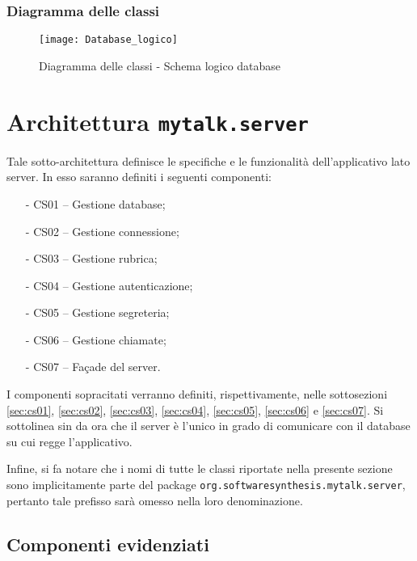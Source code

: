 \subsubsection{Diagramma delle classi}
\begin{figure}[H]
\begin{center}
\texttt{[image: Database\_logico]}
\caption{Diagramma delle classi - Schema logico database}\label{fig:database_logico}
\end{center}
\end{figure}
\clearpage


\section{Architettura \texttt{mytalk.server}}\label{sec:server}
Tale sotto-architettura definisce le specifiche e le funzionalità dell'applicativo lato server. In esso saranno definiti i seguenti componenti:
\begin{itemize}[noitemsep,nolistsep]
	\item[-] \textsf{CS01 -- Gestione database};
	\item[-] \textsf{CS02 -- Gestione connessione};
	\item[-] \textsf{CS03 -- Gestione rubrica};
	\item[-] \textsf{CS04 -- Gestione autenticazione};
	\item[-] \textsf{CS05 -- Gestione segreteria};
	\item[-] \textsf{CS06 -- Gestione chiamate};
	\item[-] \textsf{CS07 -- Façade del server}.
\end{itemize}

I componenti sopracitati verranno definiti, rispettivamente, nelle sottosezioni \ref{sec:cs01}, \ref{sec:cs02}, \ref{sec:cs03}, \ref{sec:cs04}, \ref{sec:cs05}, \ref{sec:cs06} e \ref{sec:cs07}. Si sottolinea sin da ora che il server è l'unico in grado di comunicare con il database su cui regge l'applicativo.

Infine, si fa notare che i nomi di tutte le classi riportate nella presente sezione sono implicitamente parte del package \texttt{org.softwaresynthesis.mytalk.server}, pertanto tale prefisso sarà omesso nella loro denominazione.


\subsection{Componenti evidenziati}

